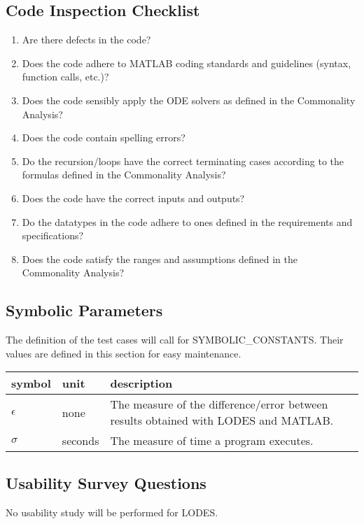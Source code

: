 \documentclass[12pt, titlepage]{article}
\newcommand{\famname}{LODES} %
\begin{document}
\subsection{Code Inspection Checklist} \label{checklist}
\begin{enumerate}
\item{Are there defects in the code?}
\item{Does the code adhere to MATLAB coding standards and guidelines (syntax, function calls, etc.)?}
\item{Does the code sensibly apply the ODE solvers as defined in the Commonality Analysis?}
\item{Does the code contain spelling errors?}
\item{Do the recursion/loops have the correct terminating cases according to the formulas defined in the Commonality Analysis?}
\item{Does the code have the correct inputs and outputs?}  
\item{Do the datatypes in the code adhere to ones defined in the requirements and specifications?}
\item{Does the code satisfy the ranges and assumptions defined in the Commonality Analysis?}
\end{enumerate}



\pagebreak

\subsection{Symbolic Parameters}

The definition of the test cases will call for SYMBOLIC\_CONSTANTS.
Their values are defined in this section for easy maintenance.

\renewcommand{\arraystretch}{1.2}
\noindent \begin{longtable*}{l l p{12cm}} \toprule
\textbf{symbol} & \textbf{unit} & \textbf{description}\\
\midrule
$\epsilon$ & none & The measure of the difference/error between results obtained with \famname{}
and MATLAB.\\
$\sigma$ & seconds & The measure of time a program executes.\\

\bottomrule
\end{longtable*}

\subsection{Usability Survey Questions}
No usability study will be performed for \famname{}.

\end{document}

